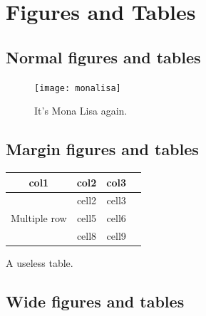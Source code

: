 \setchapterpreamble[u]{\margintoc}
\chapter{Figures and Tables}

\section{Normal figures and tables}

\blindtext

\begin{figure}[h]
	\texttt{[image: monalisa]}
	\caption{It's Mona Lisa again. \blindtext}
\end{figure}

\blindtext

\section{Margin figures and tables}

\blindtext

\begin{margintable}[*-6]
\begin{tabular}{ |c|c|c|c| } 
\hline
col1 & col2 & col3 \\
\hline
\multirow{3}{4em}{Multiple row} & cell2 & cell3 \\ 
& cell5 & cell6 \\ 
& cell8 & cell9 \\ 
\hline
\end{tabular}
\caption{A useless table.}
\end{margintable}

\section{Wide figures and tables}
